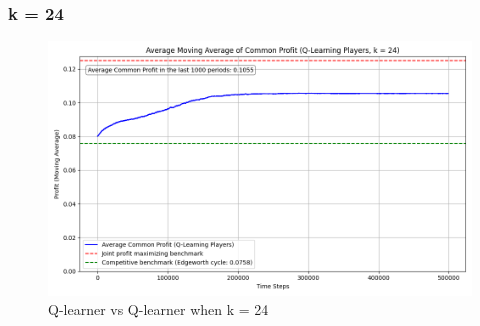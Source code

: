 \documentclass{article}
\begin{document}
\subsubsection{k = 24}
\begin{figure}[H]
    \centering
    \includegraphics[scale = 0.45]{K=24.png}
    \caption{Q-learner vs Q-learner when k = 24}
    \label{fig: QlearnervQlearnerK=24}
\end{figure}
\end{document}
